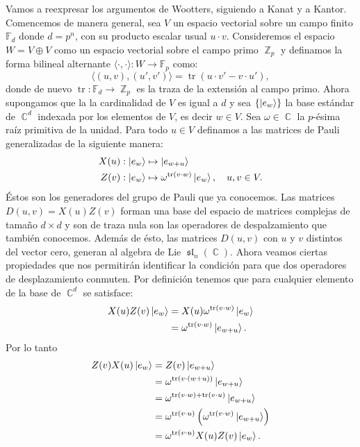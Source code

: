 \documentclass[a4paper]{report}
\DeclareMathOperator{\C}{\mathbb{C}}
\DeclareMathOperator{\Z}{\mathbb{Z}}
\DeclareMathOperator{\tr}{tr}
\DeclareMathOperator{\Sl}{\mathfrak{sl}}
\begin{document}
  Vamos a reexpresar los argumentos de Wootters, siguiendo a
  Kanat y a Kantor. Comencemos de manera general, sea $V$ un
  espacio vectorial sobre un campo finito $\mathbb F_d$
  donde $d = p^{n}$, con su producto escalar usual $u \cdot
  v$. Consideremos el espacio $W = V \oplus V$ como un
  espacio vectorial sobre el campo primo $\Z_p$ y definamos
  la forma bilineal alternante $\langle \cdot, \cdot \rangle
  : W \to \mathbb F_p$ como:
  \begin{equation}
    \langle (u,v), (u',v') \rangle
    = \tr\left( u \cdot v' - v \cdot u' \right),
  \end{equation}
  donde de nuevo $\tr : \mathbb F_d \to \Z_p$ es la traza de
  la extensión al campo primo. Ahora supongamos que la
  la cardinalidad de $V$ es igual a $d$ y sea $\{\ket{e_w}\}$ la
  base estándar de $\C^{d}$ indexada por los elementos de
  $V$, es decir $w \in V$. Sea $\omega \in \C$ la $p$-ésima
  raíz primitiva de la unidad. Para todo $u \in V$ definamos
  a las matrices de Pauli generalizadas de la siguiente
  manera:
  \begin{align}
    X(u) &: \ket{e_w} \mapsto \ket{e_{w+u}} \\
    Z(v) &: \ket{e_w} \mapsto \omega^{\tr(v \cdot w)}
    \ket{e_w},
    \quad
    u, v \in V.
  \end{align}
  Éstos son los generadores del grupo de Pauli que ya
  conocemos. Las matrices $D(u,v) = X(u)Z(v)$ forman una
  base del espacio de matrices complejas de tamaño $d \times
  d$ y son de traza nula son las operadores de
  despalzamiento que también conocemos.  Además de ésto, las
  matrices $D(u,v)$ con $u$ y $v$ distintos del vector cero,
  generan al algebra de Lie $\Sl_n(\C)$. Ahora veamos
  ciertas propiedades que nos permitirán identificar la
  condición para que dos operadores de desplazamiento
  conmuten. Por definición tenemos que para cualquier
  elemento de la base de $\C^{d}$ se satisface:
  \begin{align}
    X(u)Z(v) \ket{e_w}
    &= X(u) \omega^{\tr(v \cdot w)} \ket{e_w} \\
    &= \omega^{\tr(v \cdot w)} \ket{e_{w+u}}.
  \end{align}
  Por lo tanto
  \begin{align}
    Z(v)X(u) \ket{e_w}
    &= Z(v) \ket{e_{w+u}} \\
    &= \omega^{\tr(v \cdot (w+u))} \ket{e_{w+u}} \\
    &= \omega^{\tr(v \cdot w) + \tr(v \cdot u)}
    \ket{e_{w+u}} \\
    &= \omega^{\tr(v \cdot u)} \left( \omega^{\tr(v \cdot
    w)} \ket{e_{w+u}} \right) \\
    &= \omega^{\tr(v \cdot u)} X(u)Z(v) \ket{e_{w}}.
  \end{align}
\end{document}
